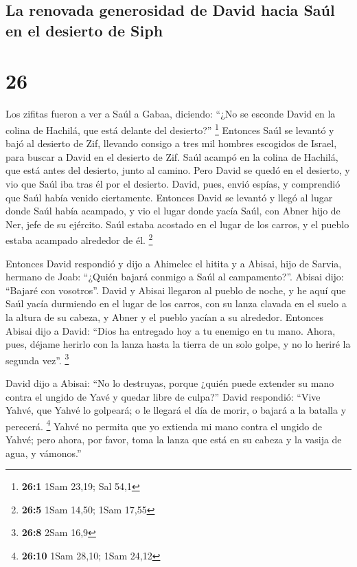 \begin{paracol}{2}
\hypertarget{la-renovada-generosidad-de-david-hacia-sauxfal-en-el-desierto-de-siph}{%
\subsection{La renovada generosidad de David hacia Saúl en el desierto
de
Siph}\label{la-renovada-generosidad-de-david-hacia-sauxfal-en-el-desierto-de-siph}}

\hypertarget{section-50}{%
\section{26}\label{section-50}}

 Los zifitas fueron a ver a Saúl a Gabaa, diciendo: ``¿No
se esconde David en la colina de Hachilá, que está delante del
desierto?'' \footnote{\textbf{26:1} 1Sam 23,19; Sal 54,1} 
Entonces Saúl se levantó y bajó al desierto de Zif, llevando consigo a
tres mil hombres escogidos de Israel, para buscar a David en el desierto
de Zif.  Saúl acampó en la colina de Hachilá, que está
antes del desierto, junto al camino. Pero David se quedó en el desierto,
y vio que Saúl iba tras él por el desierto.  David, pues,
envió espías, y comprendió que Saúl había venido ciertamente.
 Entonces David se levantó y llegó al lugar donde Saúl
había acampado, y vio el lugar donde yacía Saúl, con Abner hijo de Ner,
jefe de su ejército. Saúl estaba acostado en el lugar de los carros, y
el pueblo estaba acampado alrededor de él. \footnote{\textbf{26:5} 1Sam
  14,50; 1Sam 17,55}

 Entonces David respondió y dijo a Ahimelec el hitita y a
Abisai, hijo de Sarvia, hermano de Joab: ``¿Quién bajará conmigo a Saúl
al campamento?''. Abisai dijo: ``Bajaré con vosotros''. 
David y Abisai llegaron al pueblo de noche, y he aquí que Saúl yacía
durmiendo en el lugar de los carros, con su lanza clavada en el suelo a
la altura de su cabeza, y Abner y el pueblo yacían a su alrededor.
 Entonces Abisai dijo a David: ``Dios ha entregado hoy a
tu enemigo en tu mano. Ahora, pues, déjame herirlo con la lanza hasta la
tierra de un solo golpe, y no lo heriré la segunda vez''. \footnote{\textbf{26:8}
  2Sam 16,9}

 David dijo a Abisai: ``No lo destruyas, porque ¿quién
puede extender su mano contra el ungido de Yavé y quedar libre de
culpa?''  David respondió: ``Vive Yahvé, que Yahvé lo
golpeará; o le llegará el día de morir, o bajará a la batalla y
perecerá. \footnote{\textbf{26:10} 1Sam 28,10; 1Sam 24,12}
 Yahvé no permita que yo extienda mi mano contra el
ungido de Yahvé; pero ahora, por favor, toma la lanza que está en su
cabeza y la vasija de agua, y vámonos.''


\end{paracol}
